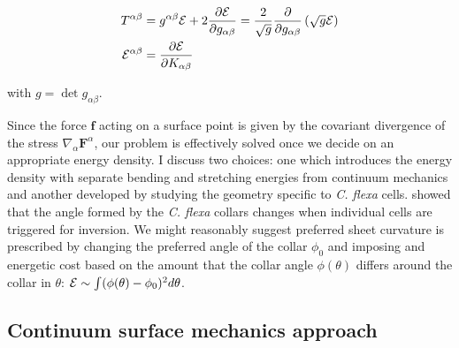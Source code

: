 \begin{align*}
    T^{\alpha\beta} &= g^{\alpha\beta} \mathcal{E} + 2 \frac{\partial \mathcal{E}}{\partial g_{\alpha\beta}} = \frac{2}{\sqrt{g}} \frac{\partial}{\partial g_{\alpha\beta}} \left(\sqrt{g}\mathcal{E} \right) \\
    \mathcal{E}^{\alpha\beta} &= \frac{\partial \mathcal{E}}{\partial K_{\alpha\beta}}
\end{align*}

\noindent with $g = \det{g_{\alpha\beta}}$.

Since the force $\bm{f}$ acting on a surface point is given by the covariant divergence of the stress $\nabla_\alpha \bm{F}^\alpha$, our problem is effectively solved once we decide on an appropriate energy density. 
I discuss two choices: one which introduces the energy density with separate bending and stretching energies from continuum mechanics and another developed by studying the geometry specific to \textit{C. flexa} cells.
\citet{brunet2019} showed that the angle formed by the \textit{C. flexa} collars changes when individual cells are triggered for inversion. 
We might reasonably suggest preferred sheet curvature is prescribed by changing the preferred angle of the collar $\phi_0$ and imposing and energetic cost based on the amount that the collar angle $\phi(\theta)$ differs around the collar in $\theta$: $\mathcal{E} \sim \int (\phi(\theta) - \phi_0)^2 d\theta$.

\subsection{Continuum surface mechanics approach} \label{subsec:cts}

